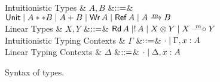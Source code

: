 \begin{figure*}
  \begin{grammar}
    Intuitionistic Types
    & $A,B$
    &$\mathrel{::=}$& $\tyUnit \bnfalt \tyProd{A}{B} \bnfalt \tySum{A}{B} \bnfalt
    \tyWr{A} \bnfalt \tyRef{A} \bnfalt \tyArr{A}{\footnotesize $m$}{B}$
    \\
    Linear Types
    & $X,Y$
    &$\mathrel{::=}$& $\tyRd{A} \bnfalt !\,A \bnfalt X \otimes Y \bnfalt X
    \lollipop{\footnotesize m} Y$
    \\
    Intuitionistic Typing Contexts
    & $\Gamma$
    &$\mathrel{::=}$& $\cdot \mathrel{\mid} \Gamma,x:A$
    \\
    Linear Typing Contexts
    & $\Delta$
    &$\mathrel{::=}$& $\cdot \mathrel{\mid} \Delta,x:A$
  \end{grammar}
\caption{Syntax of types.}
\label{fig:syntax--types}
\end{figure*}
